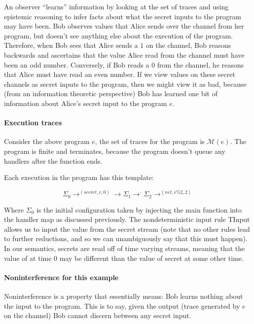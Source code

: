 \documentclass[conference]{IEEEtran}
\newcommand{\code}[1]{\text{\lstinline!#1!}}
\theoremstyle{definition}
\begin{document}
An observer ``learns'' information by looking at the set of traces and
using epistemic reasoning to infer facts about what the secret inputs
to the program may have been.  Bob observes values that Alice sends
over the \code{net} channel from her program, but doesn't see anything
else about the execution of the program.  Therefore, when Bob sees
that Alice sends a $1$ on the \code{net} channel, Bob reasons
backwards and ascertains that the value Alice read from the
\code{secret} channel must have been an odd number.  Conversely, if
Bob reads a $0$ from the \code{net} channel, he reasons that Alice
must have read an even number.  If we view values on these secret
channels as secret inputs to the program, then we might view it as
bad, because (from an information theoretic perspective) Bob has
learned one bit of information about Alice's secret input to the
program $e$.

\paragraph{Execution traces}
Consider the above program $e$, the set of traces for the program is
$\mathcal{M}(e)$.  The program is finite and terminates, because the
program doesn't queue any handlers after the \code{main} function
ends.

Each execution in the program has this template:

\[
\Sigma_0 \rightarrow^{(secret,v,0)} \rightarrow \Sigma_1 \rightarrow^\cdot \Sigma_2 \rightarrow^{(net, v \% 2, 2)}
\]

Where $\Sigma_0$ is the initial configuration taken by injecting the
main function into the handler map as discussed previously.  The
nondeterministic input rule TInput allows us to input the value from
the secret stream (note that no other rules lead to further
reductions, and so we can unambiguously say that this must happen).
In our semantics, secrets are read off of time varying streams,
meaning that the value of \code{secret} at time 0 may be different
than the value of secret at some other time.

\paragraph{Noninterference for this example}

Noninterference is a property that essentially means: Bob learns
nothing about the input to the program.  This is to say, given the
output (trace generated by $e$ on the \code{net} channel) Bob cannot
discern between any secret input.
\end{document}
